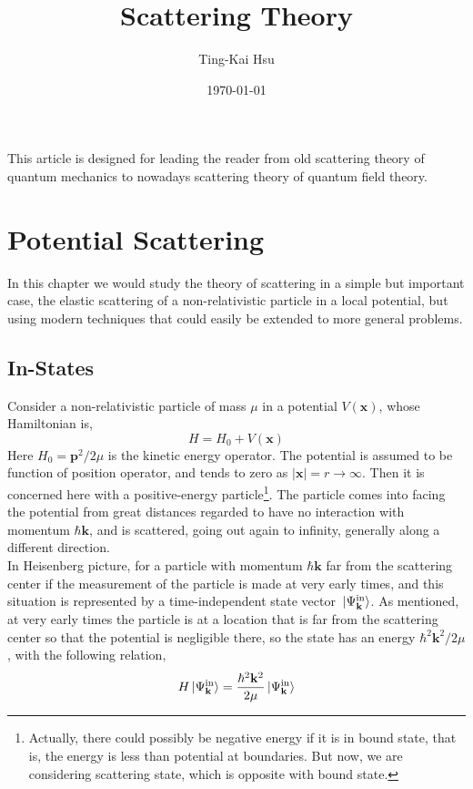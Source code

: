 \documentclass[12pt]{article}
\title{Scattering Theory}
\author{Ting-Kai Hsu}
\date{\today}
\numberwithin{equation}{section}
\begin{document}
\maketitle
\tableofcontents
This article is designed for leading the reader from old scattering theory of quantum mechanics to nowadays scattering theory of quantum field theory.
\section{Potential Scattering}
In this chapter we would study the theory of scattering in a simple but important case, the elastic scattering of a non-relativistic particle in a local potential, but using modern techniques that could easily be extended to more general problems.
\subsection{In-States}
Consider a non-relativistic particle of mass $\mu$ in a potential $V(\mathbf{x})$, whose Hamiltonian is,
\begin{equation}
    H = H_0 + V(\mathbf{x})
\end{equation}
Here $H_0 = \mathbf{p}^2/2\mu$ is the kinetic energy operator. 
The potential is assumed to be function of position operator, and tends to zero as $|\mathbf{x}| = r\rightarrow\infty$.
Then it is concerned here with a positive-energy particle\footnote{Actually, there could possibly be negative energy if it is in bound state, that is, the energy is less than potential at boundaries. But now, we are considering scattering state, which is opposite with bound state.}.
The particle comes into facing the potential from great distances regarded to have no interaction with momentum $\hbar\mathbf{k}$, and is scattered, going out again to infinity, generally along a different direction.
\\\indent In Heisenberg picture, for a particle with momentum $\hbar\mathbf{k}$ far from the scattering center if the measurement of the particle is made at very early times, and this situation is represented by a time-independent state vector $\ket*{\Psi^{\text{in}}_{\mathbf{k}}}$.
As mentioned, at very early times the particle is at a location that is far from the scattering center so that the potential is negligible there, so the state has an energy $\hbar^2\mathbf{k}^2/2\mu$, with the following relation,
\begin{equation}
    H\ket*{\Psi_{\mathbf{k}}^{\text{in}}} = \frac{\hbar^2\mathbf{k}^2}{2\mu}\ket*{\Psi_{\mathbf{k}}^{\text{in}}}
\end{equation}
\end{document}
